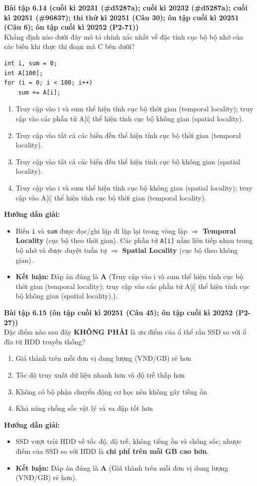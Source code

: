 \textbf{Bài tập 6.14 (cuối kì 20231 (\#d5287a); cuối kì 20232 (\#d5287a); cuối kì 20251 (\#96837); thi thử kì 20251 (Câu 30); ôn tập cuối kì 20251 (Câu 6); ôn tập cuối kì 20252 (P2-71))}\\
Khẳng định nào dưới đây mô tả chính xác nhất về đặc tính cục bộ bộ nhớ của các biến khi thực thi đoạn mã C bên dưới?
\begin{lstlisting}
int i, sum = 0;
int A[100];
for (i = 0; i < 100; i++)
    sum += A[i];
\end{lstlisting}
\begin{enumerate}[label=\Alph*.]
    \item Truy cập vào i và sum thể hiện tính cục bộ thời gian (temporal locality); truy cập vào các phần tử A[i] thể hiện tính cục bộ không gian (spatial locality).
    \item Truy cập vào tất cả các biến đều thể hiện tính cục bộ thời gian (temporal locality).
    \item Truy cập vào tất cả các biến đều thể hiện tính cục bộ không gian (spatial locality).
    \item Truy cập vào i và sum thể hiện tính cục bộ không gian (spatial locality); truy cập vào A[i] thể hiện tính cục bộ thời gian (temporal locality).
\end{enumerate}
\textbf{Hướng dẫn giải:}
\begin{itemize}
    \item Biến \texttt{i} và \texttt{sum} được đọc/ghi lặp đi lặp lại trong vòng lặp $\Rightarrow$ \textbf{Temporal Locality} (cục bộ theo thời gian). Các phần tử \texttt{A[i]} nằm liên tiếp nhau trong bộ nhớ và được duyệt tuần tự $\Rightarrow$ \textbf{Spatial Locality} (cục bộ theo không gian).
    \item \textbf{Kết luận:} Đáp án đúng là \textbf{A} (Truy cập vào i và sum thể hiện tính cục bộ thời gian (temporal locality); truy cập vào các phần tử A[i] thể hiện tính cục bộ không gian (spatial locality).).
\end{itemize}

\textbf{Bài tập 6.15 (ôn tập cuối kì 20251 (Câu 45); ôn tập cuối kì 20252 (P2-27))}\\
Đặc điểm nào sau đây \textbf{KHÔNG PHẢI} là ưu điểm của ổ thể rắn SSD so với ổ đĩa từ HDD truyền thống?
\begin{enumerate}[label=\Alph*.]
    \item Giá thành trên mỗi đơn vị dung lượng (VNĐ/GB) rẻ hơn
    \item Tốc độ truy xuất dữ liệu nhanh hơn và độ trễ thấp hơn
    \item Không có bộ phận chuyển động cơ học nên không gây tiếng ồn
    \item Khả năng chống sốc vật lý và va đập tốt hơn
\end{enumerate}
\textbf{Hướng dẫn giải:}
\begin{itemize}
    \item SSD vượt trội HDD về tốc độ, độ trễ, không tiếng ồn và chống sốc; nhược điểm của SSD so với HDD là \textbf{chi phí trên mỗi GB cao hơn}.
    \item \textbf{Kết luận:} Đáp án đúng là \textbf{A} (Giá thành trên mỗi đơn vị dung lượng (VNĐ/GB) rẻ hơn).
\end{itemize}

